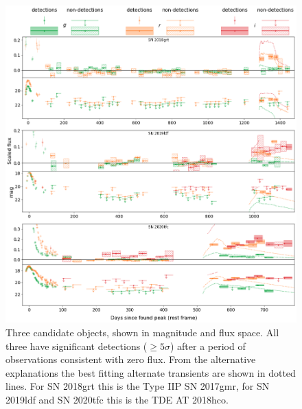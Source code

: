 \documentclass[a4paper,oneside,12pt, class=Latex/Classes/PhDthesisPSnPDF, crop=false]{standalone}
\begin{document}
\begin{figure}
 \centering
 \includegraphics[width=\textwidth]{../Images/chapter_3/candid_plots.png}
 \caption{Three candidate objects, shown in magnitude and flux space. All three have significant detections ($\geq5\sigma$) after a period of observations consistent with zero flux. From the alternative explanations the best fitting alternate transients are shown in dotted lines. For SN 2018grt this is the Type IIP SN 2017gmr, for SN 2019ldf and SN 2020tfc this is the TDE AT 2018hco.}
 \label{candidates}
\end{figure}
\end{document}
